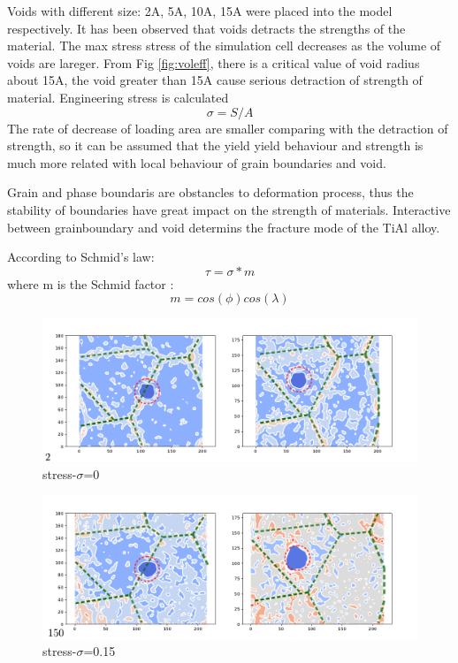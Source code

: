 \documentclass[journal,article,submit,moreauthors,pdftex,10pt,a4paper]{Definitions/mdpi}
\begin{document}
	
	
	
	
	
	
Voids with different size: 2A, 5A, 10A, 15A were placed into the model respectively. It has been observed that  voids detracts the strengths of the material. The max stress stress of the simulation cell decreases as the volume of voids are lareger. From Fig \ref{fig:voleff}, there is a critical value of void radius about 15A, the void greater than 15A cause serious detraction of strength of material. 
Engineering stress is calculated
	$$ \sigma = S/A$$
The rate of decrease of loading area are smaller comparing with the detraction of strength, so it can be assumed that the yield yield behaviour and strength is much more related with local behaviour of grain boundaries and void.
	
Grain and phase boundaris are obstancles to deformation process, thus the stability of boundaries have great impact on the strength of materials. Interactive between grainboundary and void determins the fracture mode of the TiAl alloy.
	
According to Schmid's law:
	$$\tau = \sigma*m$$
where m is the Schmid factor :
	$$ m = cos(\phi)cos(\lambda)$$
	\begin{figure}[h]
		\centering
		\includegraphics[width=0.7\linewidth]{img/frame2}
		\caption{stress-$\sigma$=0}
		\label{ }
	\end{figure}
	
	\begin{figure}[h]
		\centering
		\includegraphics[width=0.7\linewidth]{img/frame150}
		\caption{stress-$\sigma$=0.15}
		\label{ }
	\end{figure}
	
\end{document}
